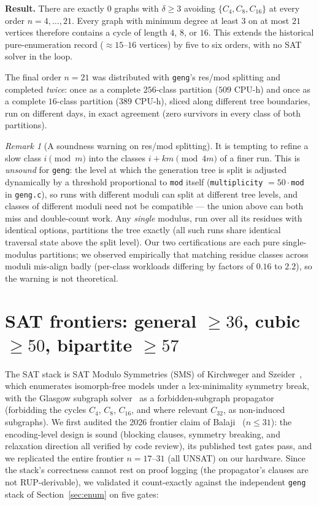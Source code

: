 \documentclass[11pt]{article}
\theoremstyle{remark}
\newtheorem{remark}[theorem]{Remark}
\newcommand{\Cyc}[1]{C_{#1}}
\begin{document}
\textbf{Result.} There are exactly $0$ graphs with $\delta\ge3$ avoiding
$\{\Cyc4,\Cyc8,\Cyc{16}\}$ at every order $n = 4,\dots,21$. Every graph with
minimum degree at least $3$ on at most $21$ vertices therefore contains a
cycle of length $4$, $8$, or $16$. This extends the historical
pure-enumeration record ($\approx 15$--$16$ vertices) by five to six orders,
with no SAT solver in the loop.

The final order $n=21$ was distributed with \texttt{geng}'s res/mod
splitting and completed \emph{twice}: once as a complete $256$-class
partition ($509$ CPU-h) and once as a complete $16$-class partition ($389$
CPU-h), sliced along different tree boundaries, run on different days, in
exact agreement (zero survivors in every class of both partitions).

\begin{remark}[A soundness warning on res/mod splitting]\label{rem:resmod}
It is tempting to refine a slow class $i \pmod m$ into the classes
$i + km \pmod{4m}$ of a finer run. This is \emph{unsound} for
\texttt{geng}: the level at which the generation tree is split is adjusted
dynamically by a threshold proportional to \texttt{mod} itself
(\texttt{multiplicity} $= 50\cdot$\texttt{mod} in \texttt{geng.c}), so runs
with different moduli can split at different tree levels, and classes of
different moduli need not be compatible --- the union above can both miss
and double-count work. Any \emph{single} modulus, run over all its residues
with identical options, partitions the tree exactly (all such runs share
identical traversal state above the split level). Our two certifications
are each pure single-modulus partitions; we observed empirically that
matching residue classes across moduli mis-align badly (per-class workloads
differing by factors of $0.16$ to $2.2$), so the warning is not
theoretical.
\end{remark}

\section{SAT frontiers: general $\ge 36$, cubic $\ge 50$, bipartite $\ge 57$}
\label{sec:sat}

The SAT stack is SAT Modulo Symmetries (SMS) of Kirchweger and
Szeider~\cite{SMS}, which enumerates isomorph-free models under a
lex-minimality symmetry break, with the Glasgow subgraph
solver~\cite{Glasgow} as a forbidden-subgraph propagator (forbidding the
cycles $\Cyc4$, $\Cyc8$, $\Cyc{16}$, and where relevant $\Cyc{32}$, as
non-induced subgraphs). We first audited the 2026 frontier claim of
Balaji~\cite{Balaji26} ($n \le 31$): the encoding-level design is sound
(blocking clauses, symmetry breaking, and relaxation direction all verified
by code review), its published test gates pass, and we replicated the entire
frontier $n = 17$--$31$ (all UNSAT) on our hardware. Since the stack's
correctness cannot rest on proof logging (the propagator's clauses are not
RUP-derivable), we validated it count-exactly against the independent
\texttt{geng} stack of Section~\ref{sec:enum} on five gates:
\end{document}
